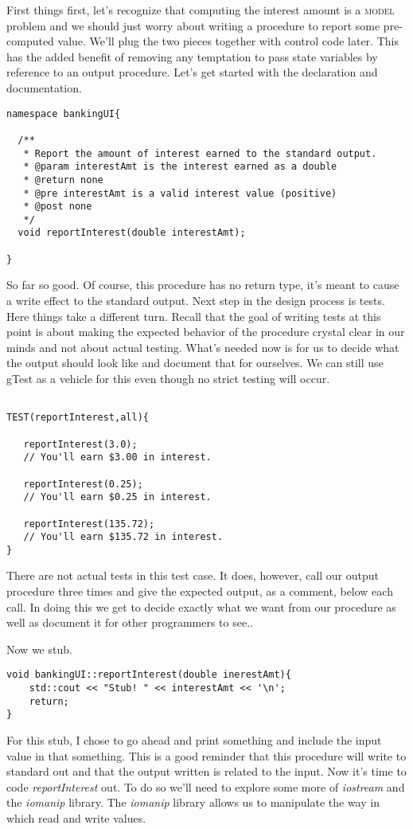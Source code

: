 \documentclass[]{tufte-handout}
\begin{document}
First things first, let's recognize that computing the interest amount is a \textsc{model} problem and we should just worry about writing a procedure to report some pre-computed value. We'll plug the two pieces together with control code later. This has the added benefit of removing any temptation to pass state variables by reference to an output procedure. Let's get started with the declaration and documentation.
\begin{verbatim}
namespace bankingUI{

  /**
   * Report the amount of interest earned to the standard output.
   * @param interestAmt is the interest earned as a double
   * @return none
   * @pre interestAmt is a valid interest value (positive)
   * @post none
   */
  void reportInterest(double interestAmt);
 
}
\end{verbatim}  

So far so good. Of course, this procedure has no return type, it's meant to  cause a write effect to the standard output. Next step in the design process is tests. Here things take a different turn.  Recall that the goal of writing tests at this point is about making the expected behavior of the procedure crystal clear in our minds and not about actual testing. What's needed now is for us to decide what the output should look like and document that for ourselves. We can still use gTest as a vehicle for this even though no strict testing will occur.

\begin{verbatim}

TEST(reportInterest,all){

   reportInterest(3.0);
   // You'll earn $3.00 in interest.
   
   reportInterest(0.25);
   // You'll earn $0.25 in interest.
   
   reportInterest(135.72);
   // You'll earn $135.72 in interest.
}

\end{verbatim}
There are not actual tests in this test case. It does, however, call our output procedure three times and give the expected output, as a comment, below each call. In doing this we get to decide exactly what we want from our procedure as well as document it for other programmers to see..

Now we stub. 
\begin{verbatim}
void bankingUI::reportInterest(double inerestAmt){
	std::cout << "Stub! " << interestAmt << '\n';	
	return;
}
\end{verbatim}
For this stub, I chose to go ahead and print something and include the input value in that something. This is a good reminder that this procedure will write to standard out and that the output written is related to the input. Now it's time to code \textit{reportInterest} out. To do so we'll need to explore some more of \textit{iostream} and the \textit{iomanip} library. The \textit{iomanip} library allows us to manipulate the way in which read and write values. 
\end{document}
